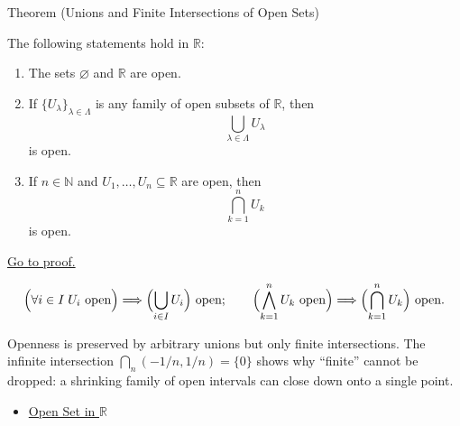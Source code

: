 \begin{theorembox}{Theorem (Unions and Finite Intersections of Open Sets)}
\begin{theorem}
\label{thm:open-set-closure-operations}
The following statements hold in $\mathbb{R}$:
\begin{enumerate}[label=(\roman*)]
  \item The sets $\varnothing$ and $\mathbb{R}$ are open.
  \item If $\{U_\lambda\}_{\lambda\in\Lambda}$ is any family of open subsets
  of $\mathbb{R}$, then
  \[
    \bigcup_{\lambda\in\Lambda}U_\lambda
  \]
  is open.
  \item If $n\in\mathbb{N}$ and $U_1,\ldots,U_n\subseteq\mathbb{R}$ are open,
  then
  \[
    \bigcap_{k=1}^{n}U_k
  \]
  is open.
\end{enumerate}
\hyperref[prf:open-set-closure-operations]{Go to proof.}
\end{theorem}
\end{theorembox}
\begin{remark*}
\[
\Bigl(\forall i\in I\;U_i\text{ open}\Bigr)\Longrightarrow \Bigl(\bigcup_{i\in I} U_{i}\Bigr) \text{ open};\qquad
\Bigl(\bigwedge_{k=1}^{n} U_k\text{ open}\Bigr)\Longrightarrow \Bigl(\bigcap_{k=1}^{n} U_{k}\Bigr) \text{ open}.
\]
\end{remark*}
\begin{remark*}[Interpretation]
Openness is preserved by arbitrary unions but only finite intersections. The infinite intersection $\bigcap_n(-1/n,1/n)=\{0\}$ shows why ``finite'' cannot be dropped: a shrinking family of open intervals can close down onto a single point.
\end{remark*}
\begin{dependencies}
\begin{itemize}
  \item \hyperref[def:open-set]{Open Set in $\mathbb{R}$}
\end{itemize}
\end{dependencies}
